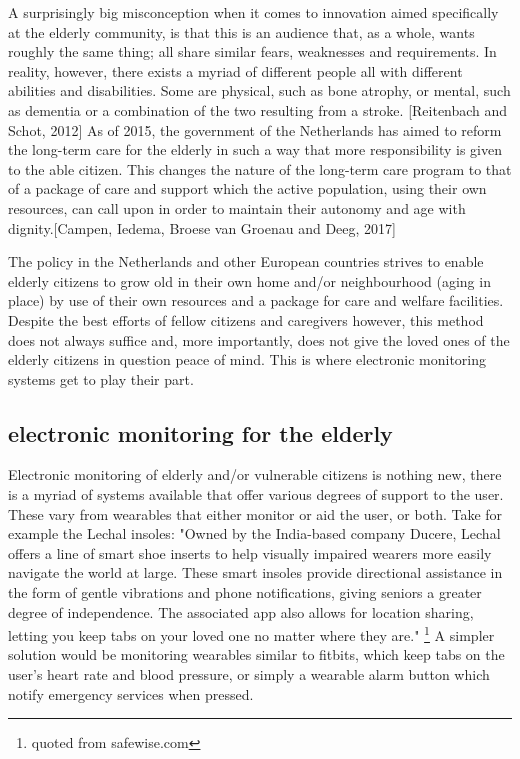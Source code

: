 \documentclass{below-ext}
\begin{document}
A surprisingly big misconception when it comes to innovation aimed specifically at the elderly community, is that this is an audience that, as a whole, wants roughly the same thing; all share similar fears, weaknesses and requirements. In reality, however, there exists a myriad of different people all with different abilities and disabilities. Some are physical, such as bone atrophy, or mental, such as dementia or a combination of the two resulting from a stroke. [Reitenbach and Schot, 2012]  As of 2015, the government of the Netherlands has aimed to reform the long-term care for the elderly in such a way that more responsibility is given to the able citizen. This changes the nature of the long-term care program to that of a package of care and support which the active population, using their own resources, can call upon in order to maintain their autonomy and age with dignity.[Campen, Iedema, Broese van Groenau and Deeg, 2017]

The policy in the Netherlands and other European countries strives to enable elderly citizens to grow old in their own home and/or neighbourhood (aging in place) by use of their own resources and a package for care and welfare facilities. \cite{thomas_blanchard} Despite the best efforts of fellow citizens and caregivers however, this method does not always suffice and, more importantly, does not give the loved ones of the elderly citizens in question peace of mind. This is where electronic monitoring systems get to play their part.


\subsection{electronic monitoring for the elderly}
Electronic monitoring of elderly and/or vulnerable citizens is nothing new, there is a myriad of systems available that offer various degrees of support to the user. These vary from wearables that either monitor or aid the user, or both. Take for example the Lechal insoles: "Owned by the India-based company Ducere, Lechal offers a line of smart shoe inserts to help visually impaired wearers more easily navigate the world at large. These smart insoles provide directional assistance in the form of gentle vibrations and phone notifications, giving seniors a greater degree of independence. The associated app also allows for location sharing, letting you keep tabs on your loved one no matter where they are." \footnote{quoted from safewise.com} A simpler solution would be monitoring wearables similar to fitbits, which keep tabs on the user's heart rate and blood pressure, or simply a wearable alarm button which notify emergency services when pressed.
\end{document}
